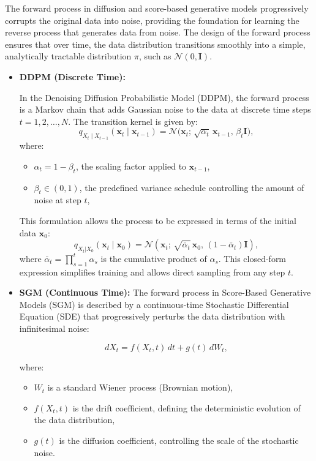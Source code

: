 The forward process in diffusion and score-based generative models progressively corrupts the original data into noise, providing the foundation for learning the reverse process that generates data from noise. The design of the forward process ensures that over time, the data distribution transitions smoothly into a simple, analytically tractable distribution $\pi$, such as \( \mathcal{N}(0, \mathbf{I}) \).

\begin{itemize}
    \item \textbf{DDPM (Discrete Time):}
    
    In the Denoising Diffusion Probabilistic Model (DDPM), the forward process is a Markov chain that adds Gaussian noise to the data at discrete time steps \( t = 1, 2, \dots, N \). The transition kernel is given by:
    \[
    q_{X_t \mid X_{t-1}}(\mathbf{x}_t \mid \mathbf{x}_{t-1}) = \mathcal{N}\bigl(\mathbf{x}_t;\, \sqrt{\alpha_t} \, \mathbf{x}_{t-1},\, \beta_t \mathbf{I}\bigr),
    \]
    where:
    \begin{itemize}
        \item \( \alpha_t = 1 - \beta_t \), the scaling factor applied to \( \mathbf{x}_{t-1} \),
        \item \( \beta_t \in (0, 1) \), the predefined variance schedule controlling the amount of noise at step \( t \),
    \end{itemize}
    This formulation allows the process to be expressed in terms of the initial data \( \mathbf{x}_0 \):
    \[
    q_{X_t|X_0}(\mathbf{x}_t \mid \mathbf{x}_0) = \mathcal{N}\left(\mathbf{x}_t;\, \sqrt{\bar{\alpha}_t} \, \mathbf{x}_0,\, (1 - \bar{\alpha}_t) \mathbf{I}\right),
    \]
    where \( \bar{\alpha}_t = \prod_{s=1}^t \alpha_s \) is the cumulative product of \( \alpha_s \). This closed-form expression simplifies training and allows direct sampling from any step \( t \).

    \item \textbf{SGM (Continuous Time):} The forward process in Score-Based Generative Models (SGM) is described by a continuous-time Stochastic Differential Equation (SDE) that progressively perturbs the data distribution with infinitesimal noise:

\[
dX_t = f(X_t, t) \, dt + g(t) \, dW_t,
\]

where:
\begin{itemize}
    \item \( W_t \) is a standard Wiener process (Brownian motion),
    \item \( f(X_t, t) \) is the drift coefficient, defining the deterministic evolution of the data distribution,
    \item \( g(t) \) is the diffusion coefficient, controlling the scale of the stochastic noise.
\end{itemize}


\end{itemize}
